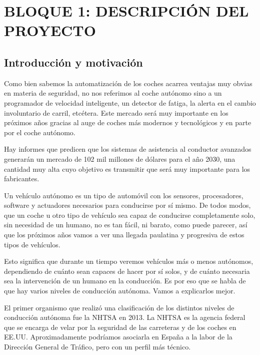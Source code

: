 \documentclass{pclass}
\begin{document}
        
\tableofcontents


\listoffigures

\listoftables

\mainmatter  


\chapter{BLOQUE 1: DESCRIPCIÓN DEL PROYECTO}
\section{Introducción y motivación}

Como bien sabemos la automatización de los coches acarrea ventajas muy obvias en materia de seguridad, no nos referimos al coche autónomo sino a un programador de velocidad inteligente, un detector de fatiga, la alerta en el cambio involuntario de carril, etcétera. Este mercado será muy importante en los próximos años gracias al auge de coches más modernos y tecnológicos y en parte por el coche autónomo.

Hay informes que predicen que los sistemas de asistencia al conductor avanzados generarán un mercado de 102 mil millones de dólares para el año 2030, una cantidad muy alta cuyo objetivo es transmitir que será muy importante para los fabricantes. 

Un vehículo autónomo es un tipo de automóvil con los sensores, procesadores, software y actuadores necesarios para conducirse por sí mismo. De todos modos, que un coche u otro tipo de vehículo sea capaz de conducirse completamente solo, sin necesidad de un humano, no es tan fácil, ni barato, como puede parecer, así que los próximos años vamos a ver una llegada paulatina y progresiva de estos tipos de vehículos.

Esto significa que durante un tiempo veremos vehículos más o menos autónomos, dependiendo de cuánto sean capaces de hacer por sí solos, y de cuánto necesaria sea la intervención de un humano en la conducción. Es por eso que se habla de que hay varios niveles de conducción autónoma. Vamos a explicarlos mejor.

El primer organismo que realizó una clasificación de los distintos niveles de conducción autónoma fue la NHTSA en 2013. La NHTSA es la agencia federal que se encarga de velar por la seguridad de las carreteras y de los coches en EE.UU. Aproximadamente podríamos asociarla en España a la labor de la Dirección General de Tráfico, pero con un perfil más técnico.
\end{document}
